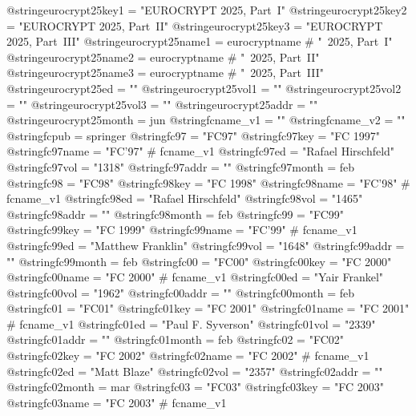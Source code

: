 @string{eurocrypt25key1 =       "EUROCRYPT 2025, Part~I"}
@string{eurocrypt25key2 =       "EUROCRYPT 2025, Part~II"}
@string{eurocrypt25key3 =       "EUROCRYPT 2025, Part~III"}
@string{eurocrypt25name1 =      eurocryptname # "~2025, Part~I"}
@string{eurocrypt25name2 =      eurocryptname # "~2025, Part~II"}
@string{eurocrypt25name3 =      eurocryptname # "~2025, Part~III"}
@string{eurocrypt25ed =         ""}
@string{eurocrypt25vol1 =       ""}
@string{eurocrypt25vol2 =       ""}
@string{eurocrypt25vol3 =       ""}
@string{eurocrypt25addr =       ""}
@string{eurocrypt25month =      jun}
@string{fcname_v1 =             ""}
@string{fcname_v2 =             ""}
@string{fcpub =                 springer}
@string{fc97 =                  "FC97"}
@string{fc97key =               "FC 1997"}
@string{fc97name =              "FC'97" # fcname_v1}
@string{fc97ed =                "Rafael Hirschfeld"}
@string{fc97vol =               "1318"}
@string{fc97addr =              ""}
@string{fc97month =             feb}
@string{fc98 =                  "FC98"}
@string{fc98key =               "FC 1998"}
@string{fc98name =              "FC'98" # fcname_v1}
@string{fc98ed =                "Rafael Hirschfeld"}
@string{fc98vol =               "1465"}
@string{fc98addr =              ""}
@string{fc98month =             feb}
@string{fc99 =                  "FC99"}
@string{fc99key =               "FC 1999"}
@string{fc99name =              "FC'99" # fcname_v1}
@string{fc99ed =                "Matthew Franklin"}
@string{fc99vol =               "1648"}
@string{fc99addr =              ""}
@string{fc99month =             feb}
@string{fc00 =                  "FC00"}
@string{fc00key =               "FC 2000"}
@string{fc00name =              "FC 2000" # fcname_v1}
@string{fc00ed =                "Yair Frankel"}
@string{fc00vol =               "1962"}
@string{fc00addr =              ""}
@string{fc00month =             feb}
@string{fc01 =                  "FC01"}
@string{fc01key =               "FC 2001"}
@string{fc01name =              "FC 2001" # fcname_v1}
@string{fc01ed =                "Paul F. Syverson"}
@string{fc01vol =               "2339"}
@string{fc01addr =              ""}
@string{fc01month =             feb}
@string{fc02 =                  "FC02"}
@string{fc02key =               "FC 2002"}
@string{fc02name =              "FC 2002" # fcname_v1}
@string{fc02ed =                "Matt Blaze"}
@string{fc02vol =               "2357"}
@string{fc02addr =              ""}
@string{fc02month =             mar}
@string{fc03 =                  "FC03"}
@string{fc03key =               "FC 2003"}
@string{fc03name =              "FC 2003" # fcname_v1}
